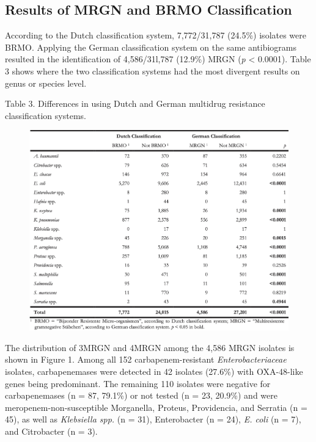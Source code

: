\documentclass[
]{book}
\begin{document}
\hypertarget{results-of-mrgn-and-brmo-classification}{%
\subsection{Results of MRGN and BRMO Classification}\label{results-of-mrgn-and-brmo-classification}}

According to the Dutch classification system, 7,772/31,787 (24.5\%) isolates were BRMO. Applying the German classification system on the same antibiograms resulted in the identification of 4,586/31l,787 (12.9\%) MRGN (\emph{p} \textless{} 0.0001). Table 3 shows where the two classification systems had the most divergent results on genus or species level.

Table 3. Differences in using Dutch and German multidrug resistance classification systems.

\begin{figure}

{\centering \includegraphics[width=1\linewidth]{images/08-t03} 

}

\end{figure}

The distribution of 3MRGN and 4MRGN among the 4,586 MRGN isolates is shown in Figure 1. Among all 152 carbapenem-resistant \emph{Enterobacteriaceae} isolates, carbapenemases were detected in 42 isolates (27.6\%) with OXA-48-like genes being predominant. The remaining 110 isolates were negative for carbapenemases (n = 87, 79.1\%) or not tested (n = 23, 20.9\%) and were meropenem-non-susceptible Morganella, Proteus, Providencia, and Serratia (n = 45), as well as \emph{Klebsiella spp.} (n = 31), Enterobacter (n = 24), \emph{E. coli} (n = 7), and Citrobacter (n = 3).
\end{document}
